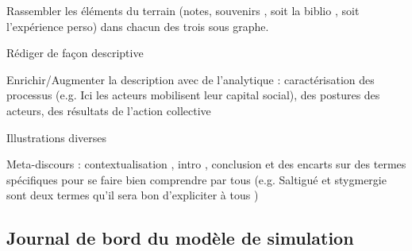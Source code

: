 Rassembler les éléments du terrain (notes, souvenirs , soit la biblio , soit l'expérience perso) dans chacun des trois sous graphe.

Rédiger de façon descriptive

Enrichir/Augmenter la description avec de l'analytique  : caractérisation des processus (e.g. Ici les acteurs mobilisent leur capital social), des postures des acteurs, des résultats de l'action collective


Illustrations diverses

Meta-discours : contextualisation , intro , conclusion et des encarts sur des termes spécifiques pour se faire bien comprendre par tous (e.g. Saltigué et stygmergie sont deux termes qu'il sera bon d'expliciter à tous )


\subsection{Journal de bord du modèle de simulation}


